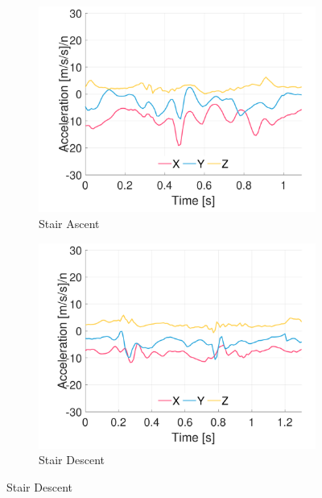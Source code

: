 \begin{figure}[p]
    \begin{subfigure}[b]{0.49\textwidth}
         \centering
         \includegraphics[width=\textwidth]{content/3-Methods/example-data/ch3_example_data_subject_01_r_hip_accel_activity_stair_down.pdf}
         \caption{Stair Ascent}
    \end{subfigure}
    \begin{subfigure}[b]{0.49\textwidth}
         \centering
         \includegraphics[width=\textwidth]{content/3-Methods/example-data/ch3_example_data_subject_01_r_hip_accel_activity_stair_up.pdf}
         \caption{Stair Descent}
    \end{subfigure}
    

\end{figure}
